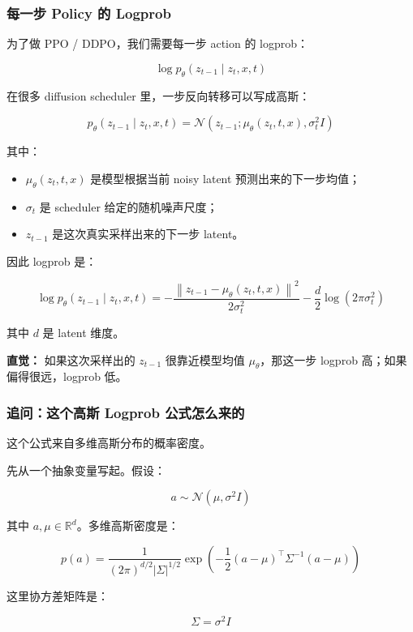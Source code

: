 \subsubsection{每一步 Policy 的 Logprob}

为了做 PPO / DDPO，我们需要每一步 action 的 logprob：

\[
\log
p_\theta(z_{t-1}\mid z_t,x,t)
\]

在很多 diffusion scheduler 里，一步反向转移可以写成高斯：

\[
p_\theta(z_{t-1}\mid z_t,x,t)
=
\mathcal{N}
\left(
z_{t-1};
\mu_\theta(z_t,t,x),
\sigma_t^2 I
\right)
\]

其中：

\begin{itemize}[leftmargin=1.5em]
  \item $\mu_\theta(z_t,t,x)$ 是模型根据当前 noisy latent 预测出来的下一步均值；
  \item $\sigma_t$ 是 scheduler 给定的随机噪声尺度；
  \item $z_{t-1}$ 是这次真实采样出来的下一步 latent。
\end{itemize}

因此 logprob 是：

\[
\log
p_\theta(z_{t-1}\mid z_t,x,t)
=
-
\frac{
\left\|
z_{t-1}
-
\mu_\theta(z_t,t,x)
\right\|^2
}{
2\sigma_t^2
}
-
\frac{d}{2}\log(2\pi\sigma_t^2)
\]

其中 $d$ 是 latent 维度。

\begin{intubox}
\textbf{直觉：} 如果这次采样出的 $z_{t-1}$ 很靠近模型均值 $\mu_\theta$，那这一步 logprob 高；如果偏得很远，logprob 低。
\end{intubox}

\subsubsection{追问：这个高斯 Logprob 公式怎么来的}

这个公式来自多维高斯分布的概率密度。

先从一个抽象变量写起。假设：

\[
a\sim\mathcal{N}(\mu,\sigma^2 I)
\]

其中 $a,\mu\in\mathbb{R}^d$。多维高斯密度是：

\[
p(a)
=
\frac{1}
{(2\pi)^{d/2}|\Sigma|^{1/2}}
\exp
\left(
-
\frac{1}{2}
(a-\mu)^\top
\Sigma^{-1}
(a-\mu)
\right)
\]

这里协方差矩阵是：

\[
\Sigma=\sigma^2 I
\]

